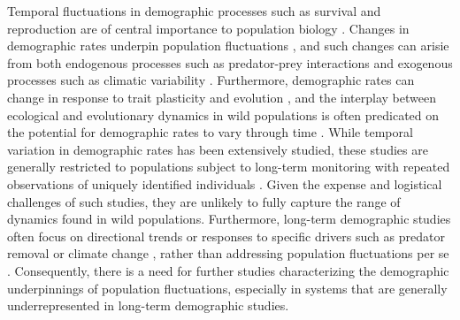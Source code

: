 \documentclass[11pt]{article}
\begin{document}
Temporal fluctuations in demographic processes such as survival and reproduction
are of central importance to population biology
\citep{twombly1994,fox2000population,koons2016life}.
Changes in demographic rates underpin population fluctuations \citep{coulson2005decomposing},
and such changes can arisie from both 
endogenous processes such as predator-prey interactions 
\citep{rosenzweig1963}
and exogenous processes such as climatic variability
\citep{elton1924}.
Furthermore, demographic rates can change in response to trait plasticity and evolution
\citep{ellner2011does, bonnet2019role},
and the interplay between ecological and evolutionary dynamics in wild populations 
is often predicated on the potential for demographic rates to vary through time
\citep{ellner2011does, coulson2006putting, siepielski2009s, ozgul2010coupled}.
While temporal variation in demographic rates has been extensively studied,
these studies are generally restricted to populations subject to long-term monitoring
with repeated observations of uniquely identified individuals 
\citep[e.g., mark-recapture;][]{fujiwara2002}.
Given the expense and logistical challenges of such studies, 
they are unlikely to fully capture the range of dynamics found in wild populations.
Furthermore, long-term demographic studies often focus on directional trends
or responses to specific drivers such as predator removal 
\citep[e.g., ][]{ diller2016demographic}
or climate change \citep{hunter2010climate},
rather than addressing 
population fluctuations per se \citep[but see][]
{white2007irruptive, koons2017understanding, taylor2018demographic, hoy2020fluctuations}.
Consequently, 
there is a need for further studies characterizing the demographic underpinnings 
of population fluctuations, 
especially in systems that are generally underrepresented 
in long-term demographic studies.
\end{document}
